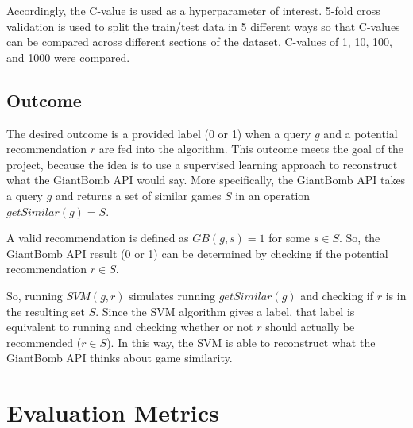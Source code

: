 \documentclass[10pt,twocolumn]{article}
\begin{document}
Accordingly, the C-value is used as a hyperparameter of interest. 5-fold cross validation is used to split the train/test data in 5 different ways so that C-values can be compared across different sections of the dataset. C-values of 1, 10, 100, and 1000 were compared.

\subsection{Outcome}
The desired outcome is a provided label (0 or 1) when a query $g$ and a potential recommendation $r$ are fed into the algorithm. This outcome meets the goal of the project, because the idea is to use a supervised learning approach to reconstruct what the GiantBomb API would say. More specifically, the GiantBomb API takes a query $g$ and returns a set of similar games $S$ in an operation $getSimilar(g) = S$. 

A valid recommendation is defined as $GB(g, s) = 1$ for some $s \in S$. So, the GiantBomb API result (0 or 1) can be determined by checking if the potential recommendation $r \in S$. 

So, running $SVM(g, r)$ simulates running $getSimilar(g)$ and checking if $r$ is in the resulting set $S$. Since the SVM algorithm gives a label, that label is equivalent to running and checking whether or not $r$ should actually be recommended ($r \in S$). In this way, the SVM is able to reconstruct what the GiantBomb API thinks about game similarity.

\section{Evaluation Metrics}


\end{document}
